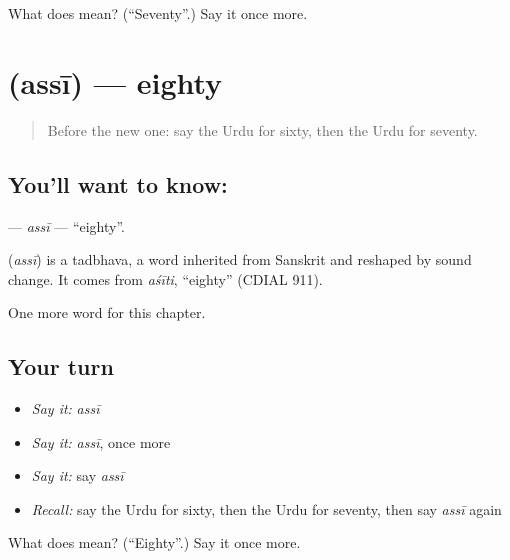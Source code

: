 \begin{tcolorbox}[breakable,colback=teal!4,colframe=teal!35!black,title={Before you move on}]
What does  mean? (\textquotedblleft{}Seventy\textquotedblright{}.) Say it once more.
\end{tcolorbox}
\section[\texorpdfstring{\ur{اسی} (assī)}{اسی (assī)}]{ (assī) — eighty}

\label{lesson:UR-C86-assi}



\begin{quote}
Before the new one: say the Urdu for sixty, then the Urdu for seventy.
\end{quote}

\subsection*{You'll want to know: }
\textbf{} — \emph{assī} — \textquotedblleft{}eighty\textquotedblright{}.

\begin{cousinweb}
\textbf{} (\emph{assī}) is a tadbhava, a word inherited from Sanskrit and reshaped by sound change. It comes from \emph{aśīti}, \textquotedblleft{}eighty\textquotedblright{} (CDIAL 911).
\end{cousinweb}

\begin{grammarlens}[title={What you've built}]
One more word for this chapter.
\end{grammarlens}

\subsection*{Your turn}
\begin{itemize}
\raggedright
  \item \emph{Say it:} \emph{assī}
  \item \emph{Say it:} \emph{assī}, once more
  \item \emph{Say it:} say \emph{assī}
  \item \emph{Recall:} say the Urdu for sixty, then the Urdu for seventy, then say \emph{assī} again
\end{itemize}

\begin{tcolorbox}[breakable,colback=teal!4,colframe=teal!35!black,title={Before you move on}]
What does  mean? (\textquotedblleft{}Eighty\textquotedblright{}.) Say it once more.
\end{tcolorbox}
